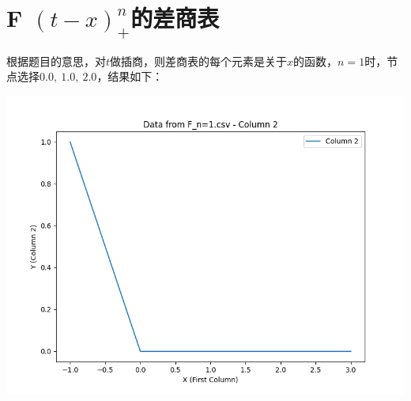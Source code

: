 \documentclass[UTF8]{ctexart}
\begin{document}
\section{F $(t-x)_{+}^n$的差商表}
根据题目的意思，对$t$做插商，则差商表的每个元素是关于$x$的函数，$n=1$时，节点选择$0.0,\  1.0,\  2.0$，结果如下：\\
\noindent %
\begin{minipage}{0.3\textwidth}
	\includegraphics[width=\linewidth]{../figure/F_n=1.csv_Column_2.png} %
\end{minipage}

\vspace{0.5em} %
\end{document}
